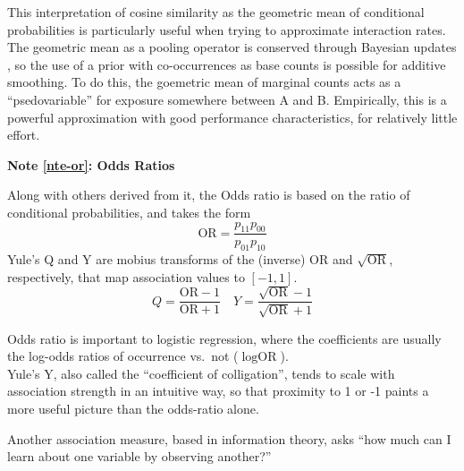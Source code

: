\documentclass[%
	12pt,
		oneside,
		letterpaper
]{book}
\newcounter{quartocalloutnteno}
\newcommand{\quartocalloutnte}[1]{\refstepcounter{quartocalloutnteno}\label{#1}}
\begin{document}
This interpretation of cosine similarity as the geometric mean of conditional probabilities is particularly useful when trying to approximate interaction rates.
The geometric mean as a pooling operator is conserved through Bayesian updates \autocite{ProbabilityAggregationMethods_Allard2012}, so the use of a prior with co-occurrences as base counts is possible for additive smoothing.
To do this, the goemetric mean of marginal counts acts as a ``psedovariable'' for exposure somewhere between A and B.
Empirically, this is a powerful approximation with good performance characteristics, for relatively little effort.

\begin{tcolorbox}[enhanced jigsaw, toprule=.15mm, left=2mm, leftrule=.75mm, rightrule=.15mm, colframe=quarto-callout-note-color-frame, arc=.35mm, colback=white, opacityback=0, bottomrule=.15mm, breakable]

\quartocalloutnte{nte-or} 

\vspace{-3mm}\textbf{Note \ref*{nte-or}: Odds Ratios}\vspace{3mm}

Along with others derived from it, the Odds ratio is based on the ratio of conditional probabilities, and takes the form \[\text{OR}=\frac{p_{11}p_{00}}{p_{01}p_{10}}\]
Yule's Q and Y \autocite{MethodsMeasuringAssociation_Yule1912} are mobius transforms of the (inverse) \(\text{OR}\) and \(\sqrt{\text{OR}}\), respectively, that map association values to \([-1,1]\).
\[Q = \frac{\text{OR}-1}{\text{OR}+1}\quad Y=\frac{\sqrt{\text{OR}}-1}{\sqrt{\text{OR}}+1}\]

\end{tcolorbox}

Odds ratio is important to logistic regression, where the coefficients are usually the log-odds ratios of occurrence vs.~not (\(\log{\text{OR}}\)).\\
Yule's Y, also called the ``coefficient of colligation'', tends to scale with association strength in an intuitive way, so that proximity to 1 or -1 paints a more useful picture than the odds-ratio alone.

Another association measure, based in information theory, asks ``how much can I learn about one variable by observing another?''
\end{document}
